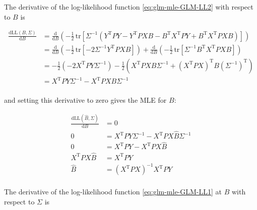 \documentclass[a4paper,12pt]{book}
\begin{document}
\vspace{1em}
The derivative of the log-likelihood function \eqref{eq:glm-mle-GLM-LL2} with respect to $B$ is

\begin{equation} \label{eq:glm-mle-dLL-dB}
\begin{split}
\frac{\mathrm{d}\mathrm{LL}(B,\Sigma)}{\mathrm{d}B} &= \frac{\mathrm{d}}{\mathrm{d}B} \left( - \frac{1}{2} \, \mathrm{tr}\left[ \Sigma^{-1} \left( Y^\mathrm{T} P Y - Y^\mathrm{T} P X B - B^\mathrm{T} X^\mathrm{T} P Y + B^\mathrm{T} X^\mathrm{T} P X B \right) \right] \right) \\
&= \frac{\mathrm{d}}{\mathrm{d}B} \left( -\frac{1}{2} \, \mathrm{tr}\left[ -2 \Sigma^{-1} Y^\mathrm{T} P X B \right] \right) + \frac{\mathrm{d}}{\mathrm{d}B} \left( -\frac{1}{2} \, \mathrm{tr}\left[ \Sigma^{-1} B^\mathrm{T} X^\mathrm{T} P X B \right] \right) \\
&= - \frac{1}{2} \left( -2 X^\mathrm{T} P Y \Sigma^{-1} \right) - \frac{1}{2} \left( X^\mathrm{T} P X B \Sigma^{-1} + (X^\mathrm{T} P X)^\mathrm{T} B (\Sigma^{-1})^\mathrm{T} \right) \\
&= X^\mathrm{T} P Y \Sigma^{-1} - X^\mathrm{T} P X B \Sigma^{-1} \\
\end{split}
\end{equation}

and setting this derivative to zero gives the MLE for $B$:

\begin{equation} \label{eq:glm-mle-B-MLE}
\begin{split}
\frac{\mathrm{d}\mathrm{LL}(\hat{B},\Sigma)}{\mathrm{d}B} &= 0 \\
0 &= X^\mathrm{T} P Y \Sigma^{-1} - X^\mathrm{T} P X \hat{B} \Sigma^{-1} \\
0 &= X^\mathrm{T} P Y - X^\mathrm{T} P X \hat{B} \\
X^\mathrm{T} P X \hat{B} &= X^\mathrm{T} P Y \\
\hat{B} &= \left( X^\mathrm{T} P X \right)^{-1} X^\mathrm{T} P Y \\
\end{split}
\end{equation}

\vspace{1em}
The derivative of the log-likelihood function \eqref{eq:glm-mle-GLM-LL1} at $\hat{B}$ with respect to $\Sigma$ is
\end{document}
